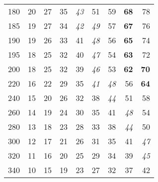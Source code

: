 \documentclass[10pt,a4paper,extrafontsizes]{memoir}
\begin{document}
\begin{table}
\begin{tabular}{r|rrrrrrrr}
180  & 20 & 27 & 35 & \textit{43} & 51 & 59 & \textbf{68} & 78 \\
185  & 19 & 27 & 34 & \textit{42} & \textit{49} & 57 & \textbf{67} & 76 \\
190  & 19 & 26 & 33 & 41 & \textit{48} & 56 & \textbf{65} & 74 \\
195  & 18 & 25 & 32 & 40 & \textit{47} & 54 & \textbf{63} & 72 \\
200  & 18 & 25 & 32 & 39 & \textit{46} & 53 & \textbf{62} & \textbf{70} \\ 
220  & 16 & 22 & 29 & 35 & \textit{41} & \textit{48} & 56 & \textbf{64} \\
240  & 15 & 20 & 26 & 32 & 38 & \textit{44} & 51 & 58 \\
260  & 14 & 19 & 24 & 30 & 35 & 41 & \textit{48} & 54 \\
280  & 13 & 18 & 23 & 28 & 33 & 38 & \textit{44} & 50 \\
300  & 12 & 17 & 21 & 26 & 31 & 35 & 41 & \textit{47} \\
320  & 11 & 16 & 20 & 25 & 29 & 34 & 39 & \textit{45} \\
340  & 10 & 15 & 19 & 23 & 27 & 32 & 37 & 42 \\
\hline
\end{tabular}
\end{table}
\end{document}
